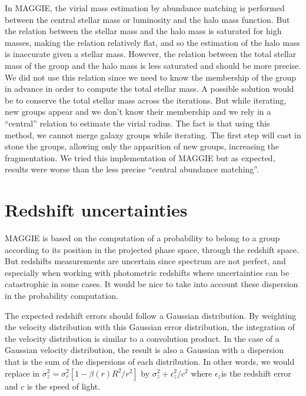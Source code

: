 In MAGGIE, the virial mass estimation by abundance matching is performed
between the central stellar mass or luminosity and the halo mass function. But
the relation between the stellar mass and the halo mass is saturated for high
masses, making the relation relatively flat, and so the estimation of the halo
mass is inaccurate given a stellar mass. However, the relation between the
total stellar mass of the group and the halo mass is less saturated and should
be more precise. We did not use this relation since we need to know the
membership of the group in advance in order to compute the total stellar mass.
A possible solution would be to conserve the total stellar mass across the
iterations. But while iterating, new groups appear and we don't know their
membership and we rely in a ``central'' relation to estimate the virial radius.
The fact is that using this method, we cannot merge galaxy groups while
iterating. The first step will cast in stone the groups, allowing only
the apparition of new groups, increasing the fragmentation. We tried this
implementation of MAGGIE but as expected, results were worse than the less
precise ``central abundance matching''.

\section{Redshift uncertainties}
\label{sec:redshift_uncertainties}

MAGGIE is based on the computation of a probability to belong to a group
according to its position in the projected phase space, through the redshift
space. But redshifts measurements are uncertain since spectrum are not perfect,
and especially when working with photometric redshifts where uncertainties can
be catastrophic in some cases. It would be nice to take into account these
dispersion in the probability computation.

The expected redshift errors should follow a Gaussian distribution. By
weighting the velocity distribution with this Gaussian error distribution, the
integration of the velocity distribution is similar to a convolution product.
In the case of a Gaussian velocity distribution, the result is also a Gaussian
with a dispersion that is the sum of the dispersions of each distribution. In
other words, we would replace in 
$\sigma_z^2 = \sigma_r^2 \left[1-\beta \left(r\right) R^2/r^2\right]$ by
$\sigma_z^2+\epsilon_z^2/c^2$ where $\epsilon_z$is the redshift error and $c$
is the speed of light.

